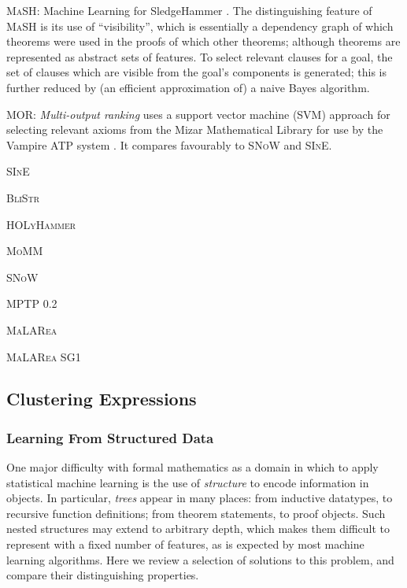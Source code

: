 \begin{description}

  \item{\textsc{MaSH}}: Machine Learning for SledgeHammer \citep{kuhlwein2013mash}. The distinguishing feature of \textsc{MaSH} is its use of ``visibility'', which is essentially a dependency graph of which theorems were used in the proofs of which other theorems; although theorems are represented as abstract sets of features. To select relevant clauses for a goal, the set of clauses which are visible from the goal's components is generated; this is further reduced by (an efficient approximation of) a naive Bayes algorithm.

  \item{\textsc{MOR}}: \emph{Multi-output ranking} uses a support vector machine (SVM) approach for selecting relevant axioms from the Mizar Mathematical Library for use by the Vampire ATP system \citep{alama2014premise}. \iffalse TODO: describe the kernel, as that's the interesting bit \fi It compares favourably to \textsc{SNoW} and \textsc{SInE}.

  \item{\textsc{SInE}}
  \item{\textsc{BliStr}}
  \item{\textsc{HOLyHammer}}
  \item{\textsc{MoMM}}
  \item{\textsc{SNoW}}
  \item{\textsc{MPTP 0.2}}
  \item{\textsc{MaLARea}}
  \item{\textsc{MaLARea SG1}}

\end{description}

\subsection{Clustering Expressions}
\label{sec:clustering}

\citep{journals/corr/abs-1212-3618}
\citep{heras2013proof}

\subsubsection{Learning From Structured Data}

One major difficulty with formal mathematics as a domain in which to apply statistical machine learning is the use of \emph{structure} to encode information in objects. In particular, \emph{trees} appear in many places: from inductive datatypes, to recursive function definitions; from theorem statements, to proof objects. Such nested structures may extend to arbitrary depth, which makes them difficult to represent with a fixed number of features, as is expected by most machine learning algorithms. Here we review a selection of solutions to this problem, and compare their distinguishing properties.

